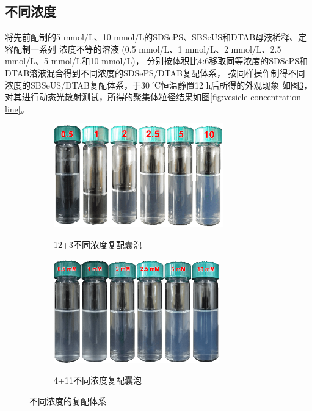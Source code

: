 \documentclass[bachelor,fandolfonts,replaceperiod]{jnuthesis}
\begin{document}
    \subsection{不同浓度}
    将先前配制的5 mmol/L、10 mmol/L的SDSePS、SBSeUS和DTAB母液稀释、定容配制一系列
    浓度不等的溶液 (0.5 mmol/L、1 mmol/L、2 mmol/L、2.5 mmol/L、5 mmol/L和10 mmol/L)，
    分别按体积比4:6移取同等浓度的SDSePS和DTAB溶液混合得到不同浓度的SDSePS/DTAB复配体系，
    按同样操作制得不同浓度的SBSeUS/DTAB复配体系，于30 ℃恒温静置12 h后所得的外观现象
    如图\ref{fig:不同浓度的复配体系}，对其进行动态光散射测试，所得的聚集体粒径结果如图\ref{fig:vesicle-concentration-line}。
    \begin{figure}[htbp]
        \centering
        \begin{subfigure}[]{\textwidth}
            \centering
            \includegraphics[height=4.5cm]{figure/SDSePS-concentration.png}\\
            \caption{12+3不同浓度复配囊泡}\label{fig:vesicle-SDSePS-concentration}
        \end{subfigure}%
        
        \begin{subfigure}[]{\textwidth}
            \centering
            \includegraphics[height=4.5cm]{figure/SBSeUS-concentration.png}\\
            \caption{4+11不同浓度复配囊泡}\label{fig:vesicle-SBSeUS-concentration}
        \end{subfigure}%
        \caption{不同浓度的复配体系}
        \label{fig:不同浓度的复配体系}
    \end{figure}
    
\end{document}
